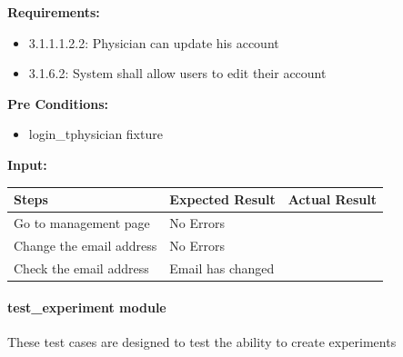 \documentclass[letterpaper,10pt,english]{sphinxmanual}
\begin{document}
\begin{fulllineitems}
\label{STD/test_edit_account:test_edit_account.test_physician_can_edit_his_account}
\textbf{Requirements:}
\begin{itemize}
\item {} 
3.1.1.1.2.2: Physician can update his account

\item {} 
3.1.6.2: System shall allow users to edit their account

\end{itemize}

\textbf{Pre Conditions:}
\begin{itemize}
\item {} 
login\_tphysician fixture

\end{itemize}

\textbf{Input:}

\begin{tabulary}{\linewidth}{|L|L|L|}
\hline
\textsf{\relax 
Steps
} & \textsf{\relax 
Expected Result
} & \textsf{\relax 
Actual Result
}\\
\hline
Go to management page
 & 
No Errors
 & \\
\hline
Change the email address
 & 
No Errors
 & \\
\hline
Check the email address
 & 
Email has changed
 & \\
\hline\end{tabulary}


\end{fulllineitems}



\paragraph{test\_experiment module}
\label{STD/test_experiment:module-test_experiment}\label{STD/test_experiment::doc}\label{STD/test_experiment:test-experiment-module}
These test cases are designed to test the ability to create experiments
\end{document}

